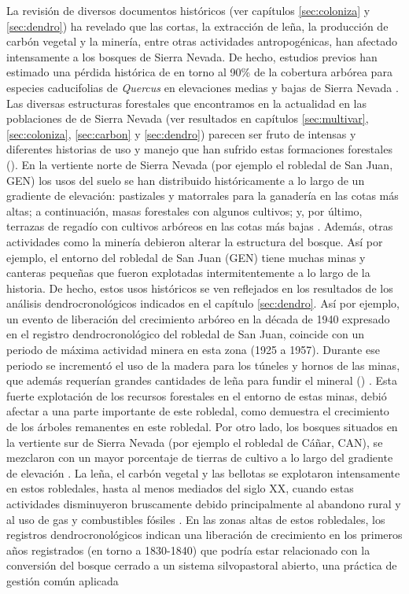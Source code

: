La revisión de diversos documentos históricos (ver capítulos \ref{sec:coloniza} y \ref{sec:dendro}) ha revelado que las cortas, la extracción de leña, la producción de carbón vegetal y la minería, entre otras actividades antropogénicas, han afectado intensamente a los bosques de Sierra Nevada. De hecho, estudios previos han estimado una pérdida histórica de en torno al 90\% de la cobertura arbórea para especies caducifolias de \emph{Quercus} en elevaciones medias y bajas de Sierra Nevada \autocite{JimenezOlivenciaetal2015MedioSiglo}. 
Las diversas estructuras forestales que encontramos en la actualidad en las poblaciones de \Qp de Sierra Nevada (ver resultados en capítulos \ref{sec:multivar}, \ref{sec:coloniza}, \ref{sec:carbon} y \ref{sec:dendro}) parecen ser fruto de intensas y diferentes historias de uso y manejo que han sufrido estas formaciones forestales (). En la vertiente norte de Sierra Nevada (por ejemplo el robledal de San Juan, GEN) los usos del suelo se han distribuido históricamente a lo largo de un gradiente de elevación: pastizales y matorrales para la ganadería en las cotas más altas; a continuación, masas forestales con algunos cultivos; y, por último, terrazas de regadío con cultivos arbóreos en las cotas más bajas \autocite{JimenezOlivenciaetal2015MedioSiglo}. Además, otras actividades como la minería debieron alterar la estructura del bosque. Así por ejemplo, el entorno del robledal de San Juan (GEN) tiene muchas minas y canteras pequeñas que fueron explotadas intermitentemente a lo largo de la historia. De hecho, estos usos históricos se ven reflejados en los resultados de los análisis dendrocronológicos indicados en el capítulo \ref{sec:dendro}. Así por ejemplo, un evento de liberación del crecimiento arbóreo en la década de 1940 expresado en el registro dendrocronológico del robledal de San Juan, coincide con un periodo de máxima actividad minera en esta zona (1925 a 1957). Durante ese periodo se incrementó el uso de la madera para los túneles y hornos de las minas, que además requerían grandes cantidades de leña para fundir el mineral () \autocites{Titos1990}. Esta fuerte explotación de los recursos forestales en el entorno de estas minas, debió afectar a una parte importante de este robledal, como demuestra el crecimiento de los árboles remanentes en este robledal. Por otro lado, los bosques situados en la vertiente sur de Sierra Nevada (por ejemplo el robledal de Cáñar, CAN), se mezclaron con un mayor porcentaje de tierras de cultivo a lo largo del gradiente de elevación \autocite{JimenezOlivenciaetal2015MedioSiglo}. La leña, el carbón vegetal y las bellotas se explotaron intensamente en estos robledales, hasta al menos mediados del siglo XX, cuando estas actividades disminuyeron bruscamente debido principalmente al abandono rural y al uso de gas y combustibles fósiles \autocite{ValbuenaCarabanaGil2013GeneticResilience,MesaTorres2009,Bonet2014conama,MorenoLlorcaetal2016HistoricalAnalysis}. En las zonas altas de estos robledales, los registros dendrocronológicos indican una liberación de crecimiento en los primeros años registrados (en torno a 1830-1840) que podría estar relacionado con la conversión del bosque cerrado a un sistema silvopastoral abierto, una práctica de gestión común aplicada 